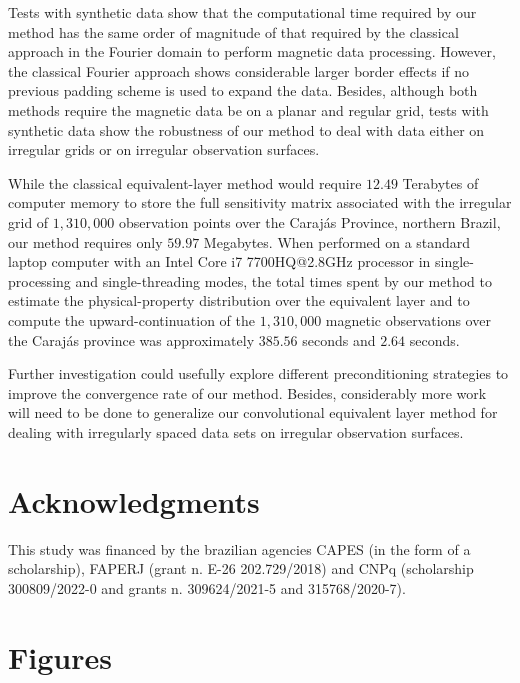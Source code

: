\documentclass[manuscript,noblind]{geophysics}
\begin{document}
Tests with synthetic data show that the computational time required by our method has 
the same order of magnitude of that required by the classical approach in the Fourier domain
to perform magnetic data processing.
However, the classical Fourier approach shows considerable larger border effects if no previous 
padding scheme is used to expand the data. 
Besides, although both methods require the magnetic data be on a planar and regular grid, 
tests with synthetic data show the robustness of our method to deal with data either on irregular grids
or on irregular observation surfaces.

While the classical equivalent-layer method would require $12.49$ Terabytes of computer memory to store the full
sensitivity matrix associated with the irregular grid of $1,310,000$ observation points over the
Carajás Province, northern Brazil, our method requires only $59.97$ Megabytes.
When performed on a standard laptop computer with an Intel Core i7 7700HQ@2.8GHz processor in
single-processing and single-threading modes, the total times spent by our method to estimate the
physical-property distribution over the equivalent layer and to compute the upward-continuation
of the $1,310,000$ magnetic observations over the Carajás province was approximately $385.56$ 
seconds and $2.64$ seconds.

Further investigation could usefully explore different preconditioning strategies to improve the
convergence rate of our method. Besides, considerably more work will need to be done to generalize
our convolutional equivalent layer method for dealing with irregularly spaced data sets on 
irregular observation surfaces.

\section{Acknowledgments}
This study was financed by the brazilian agencies CAPES (in the form of a scholarship), FAPERJ
(grant n. E-26 202.729/2018) and CNPq (scholarship 300809/2022-0 and grants n. 309624/2021-5 and 315768/2020-7).

\section{Figures}

\end{document}
